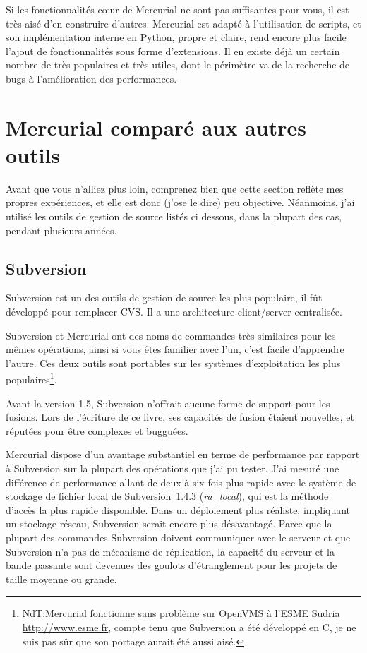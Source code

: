 Si les fonctionnalités cœur de Mercurial ne sont pas suffisantes pour vous, 
il est très aisé d'en construire d'autres. Mercurial est adapté à l'utilisation
de scripts, et son implémentation interne en Python, propre et claire,
rend encore plus facile l'ajout de fonctionnalités sous forme d'extensions. Il
en existe déjà un certain nombre de très populaires et très utiles, 
dont le périmètre va de la recherche de bugs à l'amélioration des performances.

\section{Mercurial comparé aux autres outils}

Avant que vous n'alliez plus loin, comprenez bien que cette section
reflète mes propres expériences, et elle est donc (j'ose le dire)
peu objective. Néanmoins, j'ai utilisé les outils de gestion de source
listés ci dessous, dans la plupart des cas, pendant plusieurs années.

\subsection{Subversion}

Subversion est un des outils de gestion de source les plus populaire, il fût 
développé pour remplacer CVS. Il a une architecture client/server centralisée.

Subversion et Mercurial ont des noms de commandes très similaires pour 
les mêmes opérations, ainsi si vous êtes familier avec l'un, c'est facile
d'apprendre l'autre. Ces deux outils sont portables sur les systèmes 
d'exploitation les plus populaires\footnote{NdT:Mercurial fonctionne sans problème
sur OpenVMS à l'ESME Sudria \url{http://www.esme.fr}, compte tenu que Subversion a été 
développé en C, je ne suis pas sûr que son portage aurait été aussi aisé.}.

Avant la version 1.5, Subversion n'offrait aucune forme de support pour les fusions. Lors 
de l'écriture de ce livre, ses capacités de fusion étaient nouvelles, et réputées pour être
\href{http://svnbook.red-bean.com/nightly/en/svn.branchmerge.advanced.html#svn.branchmerge.advanced.finalword}{complexes
et bugguées}.

Mercurial dispose d'un avantage substantiel en terme de performance par rapport à 
Subversion sur la plupart des opérations que j'ai pu tester. J'ai mesuré
une différence de performance allant de deux à six fois plus rapide avec
le système de stockage de fichier local de Subversion~1.4.3 
(\emph{ra\_local}), qui est la méthode d'accès la plus rapide disponible. Dans
un déploiement plus réaliste, impliquant un stockage réseau, Subversion 
serait encore plus désavantagé. Parce que la plupart des commandes Subversion
doivent communiquer avec le serveur et que Subversion n'a pas de mécanisme
de réplication, la capacité du serveur et la bande passante sont devenues des
goulots d'étranglement pour les projets de taille moyenne ou grande.

